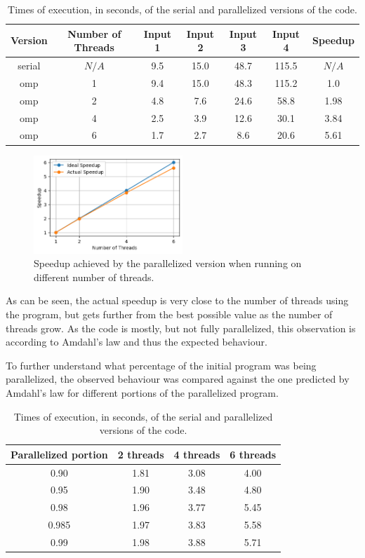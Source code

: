 \documentclass{article}
\begin{document}
\begin{table}[h!]
	\centering
	\begin{tabular}{||c c c c c c c||} 
	 \hline
	 Version & Number of Threads & Input 1 & Input 2 & Input 3 & Input 4 & Speedup\\ [0.5ex] 
	 \hline\hline
	 serial & $N/A$ & 9.5 & 15.0 & 48.7 & 115.5 & $N/A$ \\ 
	 omp & 1 & 9.4 & 15.0 & 48.3 & 115.2 & 1.0 \\ 
	 omp & 2 & 4.8 & 7.6 & 24.6 & 58.8 & 1.98 \\
	 omp & 4 & 2.5 & 3.9 & 12.6 & 30.1 & 3.84 \\
	 omp & 6 & 1.7 & 2.7 & 8.6 & 20.6 & 5.61 \\ [1ex] 
	 \hline
	\end{tabular}
	\caption{Times of execution, in seconds, of the serial and parallelized versions of the code.}
	\label{execution-times}
\end{table}

\begin{figure}[htbp]
    \centering
    \includegraphics[width=0.5\textwidth]{img/speedup-threads.png}
    \caption{Speedup achieved by the parallelized version when running on different number of threads.}
    \label{speedup}
\end{figure}

As can be seen, the actual speedup is very close to the number of threads
using the program, but gets further from the best possible value as the number
of threads grow. As the code is mostly, but not fully parallelized, this 
observation is according to Amdahl's law and thus the expected behaviour.

To further understand what percentage of the initial program was being parallelized,
the observed behaviour was compared against the one predicted by Amdahl's law
for different portions of the parallelized program.

\begin{table}[h!]
	\centering
	\begin{tabular}{||c c c c||} 
	 \hline
	 Parallelized portion & 2 threads & 4 threads & 6 threads \\ [0.5ex] 
	 \hline\hline
	 0.90 & 1.81 & 3.08 & 4.00 \\ 
	 0.95 & 1.90 & 3.48 & 4.80 \\ 
	 0.98 & 1.96 & 3.77 & 5.45 \\ 
	 0.985 & 1.97 & 3.83 & 5.58 \\ 
	 0.99 & 1.98 & 3.88 & 5.71 \\ [1ex] 
	 \hline
	\end{tabular}
	\caption{Times of execution, in seconds, of the serial and parallelized versions of the code.}
	\label{amdahl}
\end{table}
\end{document}
